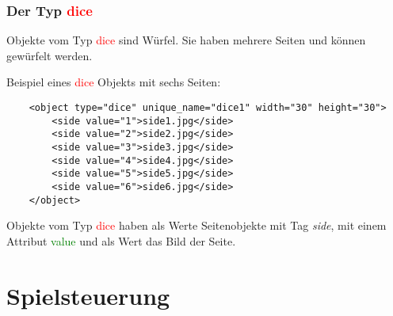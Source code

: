 \documentclass{scrbook}
\newcommand{\dice}{\textcolor{red}{dice}\xspace}
\newcommand{\xmlattribute}[1]{\textcolor{green}{#1}}
\begin{document}
	\subsection{Der Typ \dice}
	Objekte vom Typ \dice sind Würfel. Sie haben mehrere Seiten und können gewürfelt werden.

	Beispiel eines \dice Objekts mit sechs Seiten:
	
	\lstset{language=XML}
	\begin{lstlisting}	
	<object type="dice" unique_name="dice1" width="30" height="30">
		<side value="1">side1.jpg</side>
		<side value="2">side2.jpg</side>
		<side value="3">side3.jpg</side>
		<side value="4">side4.jpg</side>
		<side value="5">side5.jpg</side>
		<side value="6">side6.jpg</side>
	</object>
	\end{lstlisting}
	
	Objekte vom Typ \dice haben als Werte Seitenobjekte mit Tag \textit{side}, mit einem Attribut \xmlattribute{value} und als Wert das Bild der Seite.

	\chapter{Spielsteuerung}
\end{document}
